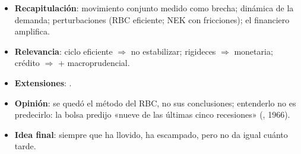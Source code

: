 \documentclass{article}
\begin{document}
\begin{columnas}
\begin{itemize}
\item \textbf{Recapitulación}: movimiento conjunto medido como brecha; dinámica de la demanda; perturbaciones (RBC eficiente; NEK con fricciones); el financiero amplifica.
\item \textbf{Relevancia}: ciclo eficiente $\Rightarrow$ no estabilizar; rigideces $\Rightarrow$ monetaria; crédito $\Rightarrow$ + macroprudencial.
\item \textbf{Extensiones}:     .
\item \textbf{Opinión}: se quedó el método del RBC, no sus conclusiones; entenderlo no es predecirlo: la bolsa predijo «nueve de las últimas cinco recesiones» (, 1966).
\item \textbf{Idea final}: siempre que ha llovido, ha escampado, pero no da igual cuánto tarde.
\end{itemize}


\end{columnas}
\end{document}
